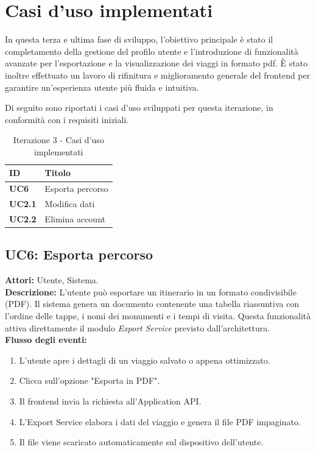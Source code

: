 
\section{Casi d'uso implementati}
In questa terza e ultima fase di sviluppo, l'obiettivo principale è stato il completamento della gestione del profilo utente e l'introduzione di funzionalità avanzate per l'esportazione e la visualizzazione dei viaggi in formato pdf. È stato inoltre effettuato un lavoro di rifinitura e miglioramento generale del frontend per garantire un'esperienza utente più fluida e intuitiva.

Di seguito sono riportati i casi d'uso sviluppati per questa iterazione, in conformità con i requisiti iniziali.

\begin{table}[htbp]
\centering
\renewcommand{\arraystretch}{1.3}
\begin{tabular}{|l|l|}
\hline
\textbf{ID} & \textbf{Titolo} \\ \hline
\textbf{UC6} & Esporta percorso \\ \hline
\textbf{UC2.1} & Modifica dati \\ \hline
\textbf{UC2.2} & Elimina account \\ \hline
\end{tabular}
\caption{Iterazione 3 - Casi d'uso implementati}
\label{tab:iterazione3_casi_uso}
\end{table}

\subsection*{UC6: Esporta percorso}
\textbf{Attori:} Utente, Sistema. \\
\textbf{Descrizione:} L'utente può esportare un itinerario in un formato condivisibile (PDF). Il sistema genera un documento contenente una tabella riassuntiva con l'ordine delle tappe, i nomi dei monumenti e i tempi di visita. Questa funzionalità attiva direttamente il modulo \textit{Export Service} previsto dall'architettura. \\
\textbf{Flusso degli eventi:}
\begin{enumerate}
    \item L'utente apre i dettagli di un viaggio salvato o appena ottimizzato.
    \item Clicca sull'opzione "Esporta in PDF".
    \item Il frontend invia la richiesta all'Application API.
    \item L'Export Service elabora i dati del viaggio e genera il file PDF impaginato.
    \item Il file viene scaricato automaticamente sul dispositivo dell'utente.
\end{enumerate}

